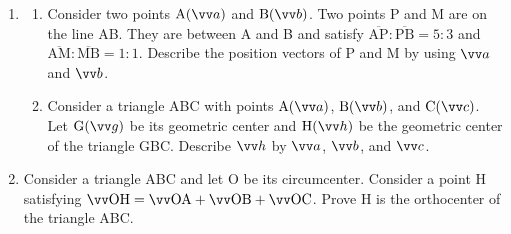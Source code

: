 \documentclass[11pt,pdfa,lastpage]{MishoNote}
\begin{document}
\begin{enumerate}[start=3]
\item[\GB{\sffamily\bfseries[12]}] \begin{enumerate}[leftmargin=1.5em,labelsep=-0.3em]
    \item Consider two points $\posvec Aa$ and $\posvec Bb$. Two points P and M are on the line AB. They are between A and B and satisfy $\overline{\mathrm{AP}}:\overline{\mathrm{PB}}=5:3$ and $\overline{\mathrm{AM}}:\overline{\mathrm{MB}}=1:1$. Describe the position vectors of P and M by using $\vc a$ and $\vc b$.
\item Consider a triangle ABC with points $\posvec Aa$, $\posvec Bb$, and $\posvec Cc$. Let $\posvec Gg$ be its geometric center and $\posvec{H}{h}$ be the geometric center of the triangle GBC. Describe $\vc h$ by $\vc a$, $\vc b$, and $\vc c$.
\end{enumerate}
\item[\GC{\sffamily\bfseries[15]}] Consider a triangle ABC and let O be its circumcenter. Consider a point H satisfying $\vvv{OH}=\vvv{OA}+\vvv{OB}+\vvv{OC}$. Prove H is the orthocenter of the triangle ABC.
\end{enumerate}
\endgroup
\end{document}
